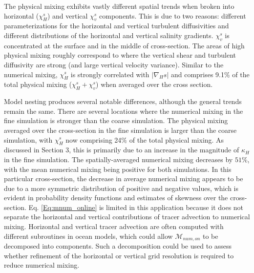 \documentclass[draft]{agujournal2019}
\begin{document}
The physical mixing exhibits vastly different spatial trends when broken into horizontal ($\chi_H^s$) and vertical $\chi_v^s$ components. This is due to two reasons: different parameterizations for the horizontal and vertical turbulent diffusivities and different distributions of the horizontal and vertical salinity gradients. $\chi_v^s$ is concentrated at the surface and in the middle of cross-section. The areas of high physical mixing roughly correspond to where the vertical shear and turbulent diffusivity are strong (and large vertical velocity variance). Similar to the numerical mixing, $\chi_H^s$ is strongly correlated with $|\nabla_H s|$ and comprises 9.1$\%$ of the total physical mixing ($\chi_H^s+\chi_v^s$) when averaged over the cross section. 

Model nesting produces several notable differences, although the general trends remain the same. There are several locations where the numerical mixing in the fine simulation is stronger than the coarse simulation. The physical mixing averaged over the cross-section in the fine simulation is larger than the coarse simulation, with $\chi_H^s$ now comprising 24$\%$ of the total physical mixing. As discussed in Section 3, this is primarily due to an increase in the magnitude of $\kappa_H$ in the fine simulation. The spatially-averaged numerical mixing decreases by $51$\%, with the mean numerical mixing being positive for both simulations. In this particular cross-section, the decrease in average numerical mixing appears to be due to a more symmetric distribution of positive and negative values, which is evident in probability density functions and estimates of skewness over the cross-section. Eq. \ref{Eq:mnum_online} is limited in this application because it does not separate the horizontal and vertical contributions of tracer advection to numerical mixing. Horizontal and vertical tracer advection are often computed with different subroutines in ocean models, which could allow $\mathcal{M}_{num, on}$ to be decomposed into components. Such a decomposition could be used to assess whether refinement of the horizontal or vertical grid resolution is required to reduce numerical mixing.
\end{document}
